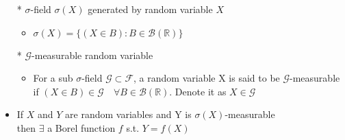 \documentclass[12pt, A4]{article}
\begin{document}
\begin{itemize}
    \item[*] $\sigma$-field $\sigma(X)$ generated by random variable $X$
    \begin{itemize}
    	\item $\sigma(X)=\{(X\in B) : B\in \mathcal{B}(\mathbb{R})\}$
    \end{itemize}
	\item[*] $\mathcal{G}$-measurable random variable
	\begin{itemize}
		\item For a sub $\sigma$-field $\mathcal{G}\subset \mathcal{F}$, a random variable X is said to be $\mathcal{G}$-measurable \\ if $(X\in B)\in \mathcal{G} \quad \forall B\in \mathcal{B}(\mathbb{R})$. Denote it as $X\in \mathcal{G}$
	\end{itemize}
    \item If $X$ and $Y$ are random variables and Y is $\sigma(X)$-measurable \\ then $\exists$ a Borel function $f$ s.t. $Y=f(X)$
\end{itemize}
\clearpage
\end{document}
